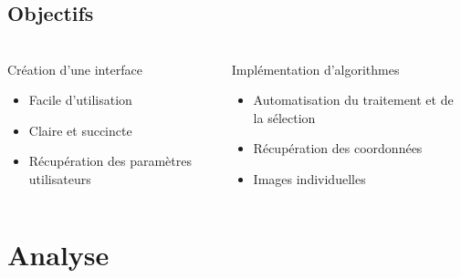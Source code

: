 \documentclass[11pt]{beamer}
\begin{document}
\subsection{Objectifs}
\begin{frame}
\frametitle{\subsecname}
	\begin{columns}[t]
		
		\begin{column}{4.5cm}
			\begin{block}{Création d'une interface}
				\begin{itemize}
					\item Facile d'utilisation
					\item Claire et succincte
					\item Récupération des paramètres utilisateurs
				\end{itemize}
			\end{block}
		\end{column}
		\begin{column}{6.5cm}
		    \begin{block}{Implémentation d'algorithmes}
				\begin{itemize}
					\item Automatisation du traitement et de la sélection
					\item Récupération des coordonnées
					\item Images individuelles
				\end{itemize}
			\end{block}
		\end{column}
	\end{columns}
\end{frame}

\section{Analyse}
\end{document}
